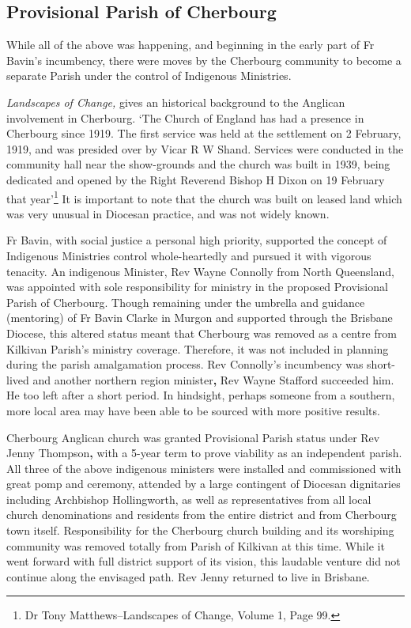 \subsection{Provisional Parish of Cherbourg}



While all of the above was happening, and beginning in the early part of Fr Bavin's incumbency, there were moves by the Cherbourg community to become a separate Parish under the control of Indigenous Ministries.



\emph{Landscapes of Change,} gives an historical background to the Anglican involvement in Cherbourg. `The Church of England has had a presence in Cherbourg since 1919. The first service was held at the settlement on 2 February, 1919, and was presided over by Vicar R W Shand. Services were conducted in the community hall near the show-grounds and the church was built in 1939, being dedicated and opened by the Right Reverend Bishop H Dixon on 19 February that year'\footnote{Dr Tony Matthews--Landscapes of Change, Volume 1, Page 99.} It is important to note that the church was built on leased land which was very unusual in Diocesan practice, and was not widely known.


Fr Bavin, with social justice a personal high priority, supported the concept of Indigenous Ministries control whole-heartedly and pursued it with vigorous tenacity. An indigenous Minister, Rev Wayne Connolly from North Queensland, was appointed with sole responsibility for ministry in the proposed Provisional Parish of Cherbourg. Though remaining under the umbrella and guidance (mentoring) of Fr Bavin Clarke in Murgon and supported through the Brisbane Diocese, this altered status meant that Cherbourg was removed as a centre from Kilkivan Parish's ministry coverage. Therefore, it was not included in planning during the parish amalgamation process. Rev Connolly's incumbency was short-lived and another northern region minister\textbf{,} Rev Wayne Stafford succeeded him. He too left after a short period. In hindsight, perhaps someone from a southern, more local area may have been able to be sourced with more positive results.



Cherbourg Anglican church was granted Provisional Parish status under Rev Jenny Thompson\textbf{,} with a 5-year term to prove viability as an independent parish. All three of the above indigenous ministers were installed and commissioned with great pomp and ceremony, attended by a large contingent of Diocesan dignitaries including Archbishop Hollingworth, as well as representatives from all local church denominations and residents from the entire district and from Cherbourg town itself. Responsibility for the Cherbourg church building and its worshiping community was removed totally from Parish of Kilkivan at this time. While it went forward with full district support of its vision, this laudable venture did not continue along the envisaged path. Rev Jenny returned to live in Brisbane.



